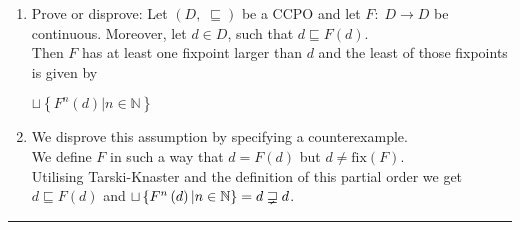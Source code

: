 \documentclass[12pt]{scrartcl}
\def\sqsupsetneq{\mathrel{\sqsupseteq\kern-0.92em\raise-0.15em\hbox{\rotatebox{313}{\scalebox{1.1}[0.75]{\(\shortmid\)}}}\scalebox{0.3}[1]{\ }}}
\begin{document}
	\begin{enumerate}
	\item[] Prove or disprove: Let $\left(D,\; \sqsubseteq\right)$ be a CCPO and let $F:\; D\rightarrow D$ be continuous. Moreover, let $d\in D$, such that $d\sqsubseteq F\left(d\right)$.\\
	Then $F$ has at least one fixpoint larger than $d$ and the least of those fixpoints is given by\\
	\begin{center} $\sqcup\left\{F^{n}\left(d\right)|n\in\mathbb{N}\right\}$\\[1cm]\end{center}
	
	\item[] We disprove this assumption by specifying a counterexample.\\
	We define $F$ in such a way that $d=F\left(d\right)$ but $d\neq \text{fix}\left(F\right)$.\\
	Utilising Tarski-Knaster and the definition of this partial order we get $d\sqsubseteq F\left(d\right)$ and $\sqcup\left\{F^{n}\left(d\right)|n\in\mathbb{N}\right\}=d\sqsupsetneq d$. \Lightning	
	\end{enumerate}

	\rule{18cm}{0.4pt}\vspace{1cm}
\end{document}
